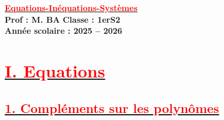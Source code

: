 \documentclass[12pt,a4paper]{article}
\begin{document}
\begin{center}
    \Large\textbf{\underline{\textcolor{red}{Equations-Inéquations-Systèmes}}}\\[-0.1cm]
    \normalsize\textbf{Prof : M. BA} \hfill \textbf{Classe : 1erS2}\\[-0.1cm]
    \textbf{Année scolaire : 2025 -- 2026}
\end{center}
\section*{\underline{\textbf{\textcolor{red}{I. Equations}}}}
\subsection*{\underline{\textbf{\textcolor{red}{1. Compléments sur les polynômes}}}}
\end{document}
